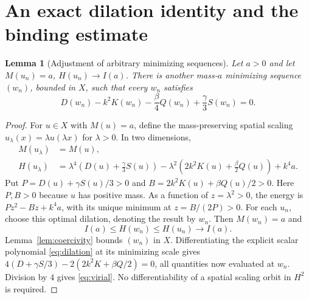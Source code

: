 \documentclass[11pt]{article}
\numberwithin{equation}{section}
\newtheorem{lemma}[theorem]{Lemma}
\theoremstyle{remark}
\begin{document}
\section{An exact dilation identity and the binding estimate}
\label{sec:binding}

\begin{lemma}[Adjustment of arbitrary minimizing sequences]
\label{lem:dilation}
Let $a>0$ and let $M(u_n)=a$, $H(u_n)\to I(a)$.
There is another mass-$a$ minimizing sequence $(w_n)$, bounded in $X$,
such that every $w_n$ satisfies
\begin{equation}\label{eq:virial}
D(w_n)-k^2K(w_n)-\frac{\beta}{4}Q(w_n)
+\frac{\gamma}{3}S(w_n)=0.
\end{equation}
\end{lemma}
\begin{proof}
For $u\in X$ with $M(u)=a$, define the mass-preserving spatial scaling
$u_\lambda(x)=\lambda u(\lambda x)$ for $\lambda>0$.
In two dimensions,
\begin{align}
M(u_\lambda)&=M(u),\\
H(u_\lambda)
&=\lambda^4\left(D(u)+\frac{\gamma}{3}S(u)\right)
-\lambda^2\left(2k^2K(u)+\frac{\beta}{2}Q(u)\right)
+k^4a.\label{eq:dilation}
\end{align}
Put $P=D(u)+\gamma S(u)/3>0$ and
$B=2k^2K(u)+\beta Q(u)/2>0$.
Here $P,B>0$ because $u$ has positive mass.  As a function of
$z=\lambda^2>0$, the energy is $Pz^2-Bz+k^4a$, with its unique
minimum at $z=B/(2P)>0$.
For each $u_n$, choose this optimal dilation, denoting the result by $w_n$.
Then $M(w_n)=a$ and
\[
I(a)\le H(w_n)\le H(u_n)\longrightarrow I(a).
\]
Lemma~\ref{lem:coercivity} bounds $(w_n)$ in $X$.
Differentiating the explicit scalar polynomial
\eqref{eq:dilation} at its minimizing scale gives
$4(D+\gamma S/3)-2(2k^2K+\beta Q/2)=0$,
all quantities now evaluated at $w_n$.
Division by $4$ gives \eqref{eq:virial}.
No differentiability of a spatial scaling orbit in $H^2$ is required.
\end{proof}
\end{document}
